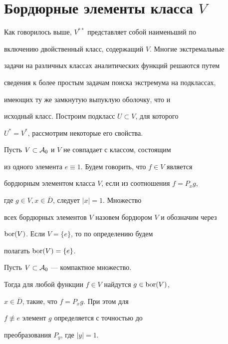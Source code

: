 \section{Бордюрные элементы класса $V$}





Как говорилось выше, $V^{**}$ представляет собой наименьший по


включению двойственный класс, содержащий $V$. Многие экстремальные


задачи на различных классах аналитических функций решаются путем


сведения к более простым задачам поиска экстремума на подклассах, 


имеющих ту же замкнутую выпуклую оболочку, что и 


исходный класс. Построим подкласс $U \subset V$, для которого 


$U^* =V^*$, рассмотрим некоторые его свойства.





Пусть $V\subset{\cal A}_0$ и $V$ не совпадает с классом, состоящим


из одного элемента $e \equiv 1$. Будем говорить, что $f\in V$ является 


бордюрным элементом класса $V$, если из соотношения $f=P_x g$, 


где $g\in V, x \in \overline{D}$, следует $|x|=1$. Множество 


всех бордюрных элементов $V$ назовем бордюром $V$ и обозначим через 


$\operatorname{bor}(V)$. Если $V= \{ e \}$, то по определению будем


полагать $\operatorname{bor}(V)= \{ e \}$.





\begin{lem}


Пусть $V \subset {\cal A}_0$ --- компактное множество.


Тогда для любой функции $f\in V$ найдутся $g\in \operatorname{bor}(V)$, 


$x \in \overline{D}$, такие, что $f=P_x g$. При этом для 


$f \not\equiv e$ элемент $g$ определяется с точностью до 


преобразования $P_y$, где $|y|=1$.


\end{lem}





